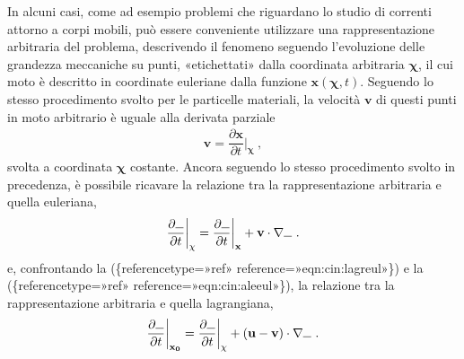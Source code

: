 \documentclass[letterpaper,10pt,italian]{jupyterBook}
\begin{document}
\sphinxAtStartPar
In alcuni casi, come ad esempio problemi che riguardano lo studio di
correnti attorno a corpi mobili, può essere conveniente utilizzare una
rappresentazione arbitraria del problema, descrivendo il fenomeno
seguendo l’evoluzione delle grandezza meccaniche su punti, «etichettati»
dalla coordinata arbitraria \(\mathbf{\chi}\), il cui moto è descritto in
coordinate euleriane dalla funzione \(\mathbf{x}(\mathbf{\chi},t)\). Seguendo lo
stesso procedimento svolto per le particelle materiali, la velocità
\(\mathbf{v}\) di questi punti in moto arbitrario è uguale alla derivata
parziale
\begin{equation*}
\begin{split}\mathbf{v} = \dfrac{\partial \mathbf{x}}{\partial t} \bigg|_{\mathbf{\chi}} \ ,\end{split}
\end{equation*}
\sphinxAtStartPar
svolta a coordinata \(\mathbf{\chi}\) costante. Ancora seguendo lo stesso
procedimento svolto in precedenza, è possibile ricavare la relazione tra
la rappresentazione arbitraria e quella euleriana,
\begin{equation*}
\begin{split}\label{eqn:cin:ale-eul}
 \dfrac{\partial \rule{1.5ex}{.4pt}}{\partial t} \bigg|_{\mathbf{\chi}} = \dfrac{\partial \rule{1.5ex}{.4pt}}{\partial t} \bigg|_{\mathbf{x}} + \mathbf{v} \cdot \mathbf{\nabla} \rule{1.5ex}{.4pt} \ .\end{split}
\end{equation*}
\sphinxAtStartPar
e, confrontando la
(\{reference\sphinxhyphen{}type=»ref»
reference=»eqn:cin:lagr\sphinxhyphen{}eul»\}) e la
(\{reference\sphinxhyphen{}type=»ref»
reference=»eqn:cin:ale\sphinxhyphen{}eul»\}), la relazione tra la rappresentazione
arbitraria e quella lagrangiana,
\begin{equation*}
\begin{split}\dfrac{\partial \rule{1.5ex}{.4pt}}{\partial t} \bigg|_{\mathbf{x_0}} = \dfrac{\partial \rule{1.5ex}{.4pt}}{\partial t} \bigg|_{\mathbf{\chi}} + (\mathbf{u} - \mathbf{v}) \cdot \mathbf{\nabla} \rule{1.5ex}{.4pt} \ .\end{split}
\end{equation*}
\end{document}
